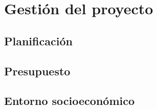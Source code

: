 \chapter{Gestión del proyecto}
\label{ch:project-management}


\section{Planificación}

\section{Presupuesto}

\section{Entorno socioeconómico}
